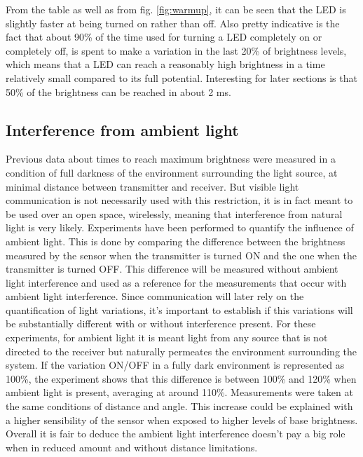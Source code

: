 From the table as well as from fig. \ref{fig:warmup}, it can be seen that the LED is slightly faster at being turned on rather than off.
Also pretty indicative is the fact that about 90\% of the time used for turning a LED completely on or completely off, is spent to make a variation in the last 20\% of brightness levels, which means that a LED can reach a reasonably high brightness in a time relatively small compared to its full potential.
Interesting for later sections is that 50\% of the brightness can be reached in about 2 ms.

\subsection{Interference from ambient light}
Previous data about times to reach maximum brightness were measured in a condition of full darkness of the environment surrounding the light source, at minimal distance between transmitter and receiver.
But visible light communication is not necessarily used with this restriction, it is in fact meant to be used over an open space, wirelessly,  meaning that interference from natural light is very likely.
 Experiments have been performed to quantify the influence of ambient light.
 This is done by comparing the difference between the brightness measured by the sensor when the transmitter is turned ON and the one when the transmitter is turned OFF.
 This difference will be measured without ambient light interference and used as a reference for the measurements that occur with ambient light interference.
 Since communication  will later rely on the quantification of light variations, it's important to establish if this variations will be substantially different with or without interference present.
 For these experiments, for ambient light it is meant light from any source that is not directed to the receiver but naturally permeates the environment surrounding the system.
 If the variation ON/OFF in a fully dark environment is represented as 100\%, the experiment shows that this difference is between 100\% and 120\% when ambient light is present, averaging at around 110\%. 
Measurements were taken at the same conditions of distance and angle.
This increase could be explained with a higher sensibility of the sensor when exposed to higher levels of base brightness.
Overall it is fair to deduce the ambient light interference doesn't pay a big role when in reduced amount and without distance limitations.

